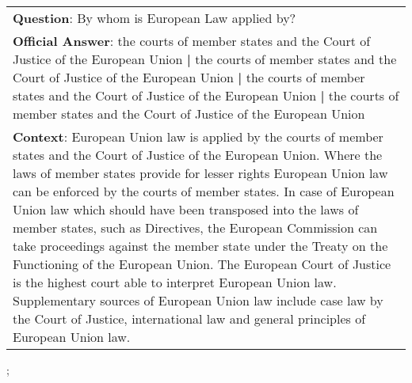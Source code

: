 \begin{figure*}[ht]
{\begin{tabular}{p{}}
            \textbf{Question}: By whom is European Law applied by?                                                                                                                                                                                                                                                                                                                                                                                                                                                                                                                                                                                                                                                                                                          \\
            \textbf{Official Answer}: the courts of member states and the Court of Justice of the European Union \textbf{|} the courts of member states and the Court of Justice of the European Union \textbf{|} the courts of member states and the Court of Justice of the European Union \textbf{|} the courts of member states and the Court of Justice of the European Union                                                                                                                                                                                                                                                                                                                                                                                          \\
            \textbf{Context}: European Union law is applied by the courts of member states and the Court of Justice of the European Union. Where the laws of member states provide for lesser rights European Union law can be enforced by the courts of member states. In case of European Union law which should have been transposed into the laws of member states, such as Directives, the European Commission can take proceedings against the member state under the Treaty on the Functioning of the European Union. The European Court of Justice is the highest court able to interpret European Union law. Supplementary sources of European Union law include case law by the Court of Justice, international law and general principles of European Union law. \\
        \end{tabular}
    };
    \label{fig:ex-57268bf9dd62a815002e890a}
\end{figure*}


